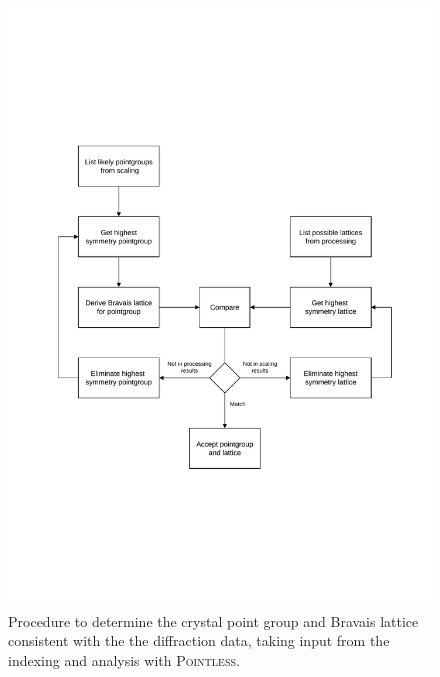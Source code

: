 \documentclass[a4paper, 11pt]{article}
\begin{document}
\begin{figure}
\caption{Procedure to determine the crystal point group and Bravais
  lattice consistent with the the diffraction data, taking input from
  the indexing and analysis with \textsc{Pointless}.
\label{figure:scaling_1}}
\centering
\includegraphics[scale=0.5]{figures/scaling-step-1.pdf}
\end{figure}
\end{document}

